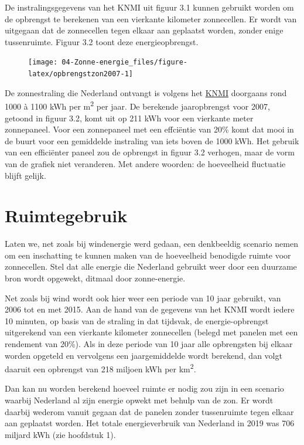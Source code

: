 \documentclass[
  11pt,
  a4paper,
]{book}
\begin{document}
De instralingsgegevens van het KNMI uit figuur 3.1 kunnen gebruikt worden om de opbrengst te berekenen van een vierkante kilometer zonnecellen. Er wordt van uitgegaan dat de zonnecellen tegen elkaar aan geplaatst worden, zonder enige tussenruimte. Figuur 3.2 toont deze energieopbrengst.

\begin{figure}

{\centering \texttt{[image: 04-Zonne-energie\_files/figure-latex/opbrengstzon2007-1]} 

}

\end{figure}

De zonnestraling die Nederland ontvangt is volgens het \href{https://www.knmi.nl/over-het-knmi/nieuws/zonnestraling-in-2019}{KNMI} doorgaans rond 1000 à 1100 kWh per m\textsuperscript{2} per jaar. De berekende jaaropbrengst voor 2007, getoond in figuur 3.2, komt uit op 211 kWh voor een vierkante meter zonnepaneel. Voor een zonnepaneel met een effciëntie van 20\% komt dat mooi in de buurt voor een gemiddelde instraling van iets boven de 1000 kWh. Het gebruik van een efficiënter paneel zou de opbrengst in figuur 3.2 verhogen, maar de vorm van de grafiek niet veranderen. Met andere woorden: de hoeveelheid fluctuatie blijft gelijk.

\hypertarget{ruimtegebruik-1}{%
\section{Ruimtegebruik}\label{ruimtegebruik-1}}

Laten we, net zoals bij windenergie werd gedaan, een denkbeeldig scenario nemen om een inschatting te kunnen maken van de hoeveelheid benodigde ruimte voor zonnecellen. Stel dat alle energie die Nederland gebruikt weer door een duurzame bron wordt opgewekt, ditmaal door zonne-energie.

Net zoals bij wind wordt ook hier weer een periode van 10 jaar gebruikt, van 2006 tot en met 2015. Aan de hand van de gegevens van het KNMI wordt iedere 10 minuten, op basis van de straling in dat tijdsvak, de energie-opbrengst uitgerekend van een vierkante kilometer zonnecellen (belegd met panelen met een rendement van 20\%). Als in deze periode van 10 jaar alle opbrengsten bij elkaar worden opgeteld en vervolgens een jaargemiddelde wordt berekend, dan volgt daaruit een opbrengst van 218 miljoen kWh per km\textsuperscript{2}.

Dan kan nu worden berekend hoeveel ruimte er nodig zou zijn in een scenario waarbij Nederland al zijn energie opwekt met behulp van de zon. Er wordt daarbij wederom vanuit gegaan dat de panelen zonder tussenruimte tegen elkaar aan geplaatst worden. Het totale energieverbruik van Nederland in 2019 was 706 miljard kWh (zie hoofdstuk 1).
\end{document}
